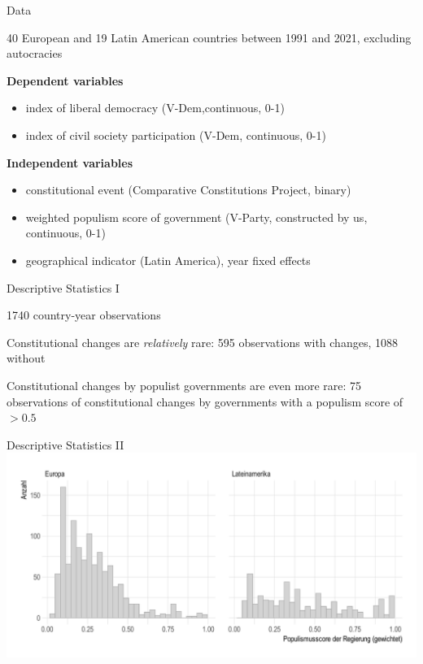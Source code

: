 \documentclass[xcolor=dvipsnames,aspectratio=169,12pt]{beamer}
\begin{document}
\begin{frame}{Data}
    \begin{wideitemize}
        \item 40 European and  19 Latin American countries between 1991 and 2021, excluding autocracies
        \item \textbf{Dependent variables}
        \begin{itemize}
        \item index of liberal democracy (V-Dem,continuous, 0-1)
        \item index of civil society participation (V-Dem, continuous, 0-1)
        \end{itemize}
        \item \textbf{Independent variables}
        \begin{itemize}
            \item constitutional event (Comparative Constitutions Project, binary)
            \item weighted populism score of government (V-Party, constructed by us, continuous, 0-1)
            \item geographical indicator (Latin America), year fixed effects
        \end{itemize}
    \end{wideitemize} 
\end{frame}

\begin{frame}{Descriptive Statistics I}
\begin{wideitemize}
    \item 1740 country-year observations
    \item Constitutional changes are \textit{relatively} rare: 595 observations with changes, 1088 without
    \item Constitutional changes by populist governments are even more rare: 75 observations of constitutional changes by governments with a populism score of $>0.5$
\end{wideitemize} 
\end{frame}

\begin{frame}{Descriptive Statistics II}
\includegraphics[width=1\textwidth]{fig/populismscorehist}
\end{frame}
\end{document}
